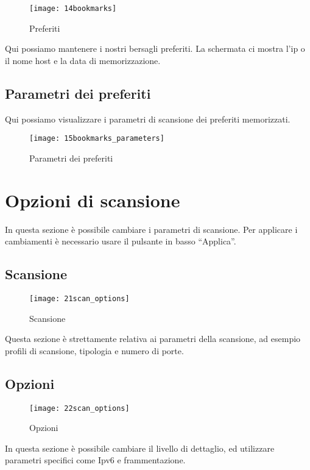 \begin{figure}[h]
  \centering
  \texttt{[image: 14bookmarks]}
  \caption{Preferiti}
  \label{fig:Bookmarks}
\end{figure}
Qui possiamo mantenere i nostri bersagli preferiti. La schermata ci mostra l'ip 
o il nome host e la data di memorizzazione.

\subsection{Parametri dei preferiti}
\label{sec:BookmarksParameters}

Qui possiamo visualizzare i parametri di scansione dei preferiti memorizzati.
\begin{figure}[h]
  \centering
  \texttt{[image: 15bookmarks\_parameters]}
  \caption{Parametri dei preferiti}
  \label{fig:BookmarksParameters}
\end{figure}


\section{Opzioni di scansione}
\label{sec:ScanOptions}

In questa sezione \`e possibile cambiare i parametri di scansione. Per applicare 
i cambiamenti \`e necessario usare il pulsante in basso ``Applica''.

\subsection{Scansione}
\label{sec:ScanParameters}

\begin{figure}[h]
  \centering
  \texttt{[image: 21scan\_options]}
  \caption{Scansione}
  \label{fig:ScanParameters}
\end{figure}
Questa sezione \`e strettamente relativa ai parametri della scansione, ad 
esempio profili di scansione, tipologia e numero di porte.

\subsection{Opzioni}
\label{sec:ScanParamOptions}

\begin{figure}[h]
  \centering
  \texttt{[image: 22scan\_options]}
  \caption{Opzioni}
  \label{fig:ScanParamOptions}
\end{figure}
In questa sezione \`e possibile cambiare il livello di dettaglio, ed utilizzare 
parametri specifici come Ipv6 e frammentazione.

